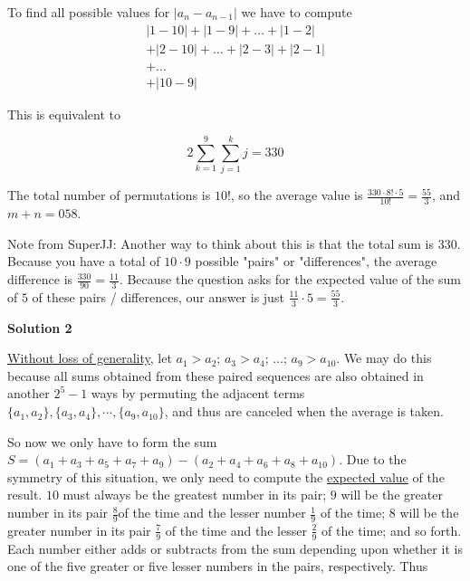\begin{enumerate}
 To find all possible values for $|a_n - a_{n - 1}|$ we have to compute
 \begin{eqnarray*} |1 - 10| + |1 - 9| + \ldots + |1 - 2|\\ + |2 - 10| + \ldots + |2 - 3| + |2 - 1|\\ + \ldots\\ + |10 - 9| \end{eqnarray*}

 This is equivalent to

 
 \[2\sum\limits_{k = 1}^{9}\sum\limits_{j = 1}^{k}j = 330\]

 The total number of permutations is $10!$, so the average value is $\frac {330 \cdot  8!  \cdot  5}{10!} = \frac {55}{3}$, and $m+n = \boxed{058}$.

 Note from SuperJJ: Another way to think about this is that the total sum is 330. Because you have a total of $10 \cdot 9$ possible "pairs" or "differences", the average difference is $\frac{330}{90} = \frac{11}{3}$. Because the question asks for the expected value of the sum of $5$ of these pairs / differences, our answer is just $\frac{11}{3} \cdot 5 = {\frac{55}{3}}$.

 



\textbf{Solution 2}

\href{https://artofproblemsolving.com/wiki/index.php?title=Without\_loss\_of\_generality}{Without loss of generality}, let $a_1 > a_2;\, a_3 > a_4;\, \ldots ;\, a_9 > a_{10}$. We may do this because all sums obtained from these paired sequences are also obtained in another $2^5-1$ ways by permuting the adjacent terms $\{a_1,a_2\},\{a_3,a_4\}, \cdots , \{a_9, a_{10}\}$, and thus are canceled when the average is taken. 

 So now we only have to form the sum $S= (a_1 + a_3 + a_5 + a_7 + a_9) - (a_2 + a_4 + a_6 + a_8 + a_{10})$. Due to the symmetry of this situation, we only need to compute the \href{https://artofproblemsolving.com/wiki/index.php?title=Expected\_value}{expected value} of the result. $10$ must always be the greatest number in its pair; $9$ will be the greater number in its pair $\frac{8}{9}$of the time and the lesser number $\frac 19$ of the time; $8$ will be the greater number in its pair $\frac 79$ of the time and the lesser $\frac 29$ of the time; and so forth. Each number either adds or subtracts from the sum depending upon whether it is one of the five greater or five lesser numbers in the pairs, respectively. Thus


\end{enumerate}

